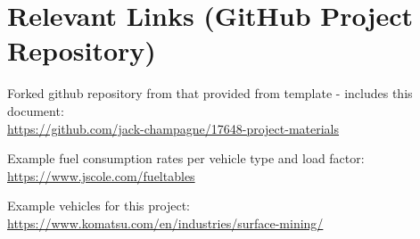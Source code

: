 \section{Relevant Links (GitHub Project Repository)}

Forked github repository from that provided from template - includes this document:\\
\url{https://github.com/jack-champagne/17648-project-materials}

Example fuel consumption rates per vehicle type and load factor:\\
\url{https://www.jscole.com/fueltables}

Example vehicles for this project:\\
\url{https://www.komatsu.com/en/industries/surface-mining/}